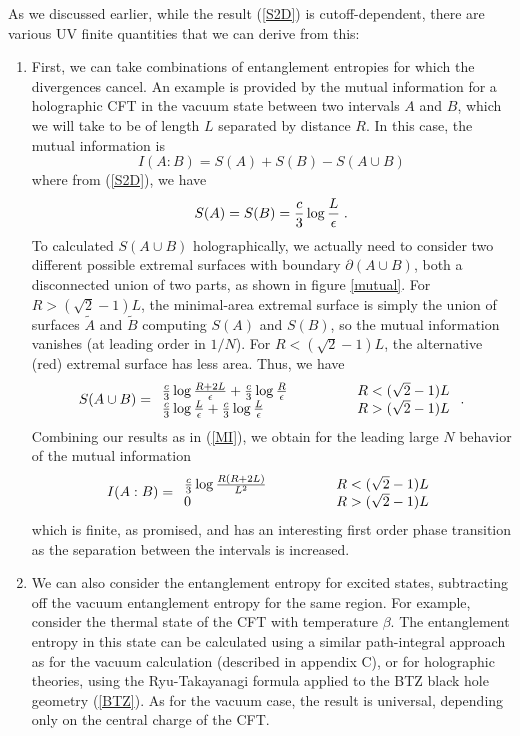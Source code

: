 \documentclass[12pt,epsf]{article}
\newcommand{\be}{\begin{equation}}
\newcommand{\ee}{\end{equation}}
\newcommand{\ba}{\begin{array}}
\newcommand{\ea}{\end{array}}
\begin{document}
As we discussed earlier, while the result (\ref{S2D}) is cutoff-dependent, there are various UV finite quantities that we can derive from this:

\begin{enumerate}
\item
First, we can take combinations of entanglement entropies for which the divergences cancel. An example is provided by the mutual information for a holographic CFT in the vacuum state between two intervals $A$ and $B$, which we will take to be of length $L$ separated by distance $R$. In this case, the mutual information is
\be
\label{MI}
I(A:B) = S(A) + S(B) - S(A \cup B)
\ee
where from (\ref{S2D}), we have
\be
S(A) = S(B) = {c \over 3} \log {L \over \epsilon} \; .
\ee
To calculated $S(A \cup B)$ holographically, we actually need to consider two different possible extremal surfaces with boundary $\partial (A \cup B)$, both a disconnected union of two parts, as shown in figure \ref{mutual}. For $R > (\sqrt{2} - 1)L$, the minimal-area extremal surface is simply the union of surfaces $\tilde{A}$ and $\tilde{B}$ computing $S(A)$ and $S(B)$, so the mutual information vanishes (at leading order in $1/N$). For $R < (\sqrt{2} - 1) L$, the alternative (red) extremal surface has less area. Thus, we have
\be
S(A \cup B) = \ba{ll} {c \over 3} \log {R + 2 L \over \epsilon} + {c \over 3}\log {R \over \epsilon} & \qquad \qquad  R < (\sqrt{2} - 1) L \cr
{c \over 3} \log {L \over \epsilon}  + {c \over 3} \log {L \over \epsilon} & \qquad \qquad R > (\sqrt{2} - 1) L \ea \; .
\ee
Combining our results as in (\ref{MI}), we obtain for the leading large $N$ behavior of the mutual information
\be
I(A:B) = \ba{ll} {c \over 3} \log {R(R + 2 L) \over L^2} & \qquad \qquad  R < (\sqrt{2} - 1) L \cr
0 & \qquad \qquad R > (\sqrt{2} - 1) L \ea
\ee
which is finite, as promised, and has an interesting first order phase transition as the separation between the intervals is increased.
\item
We can also consider the entanglement entropy for excited states, subtracting off the vacuum entanglement entropy for the same region. For example, consider the thermal state of the CFT with temperature $\beta$. The entanglement entropy in this state can be calculated \cite{Calabrese:2004eu} using a similar path-integral approach as for the vacuum calculation (described in appendix C), or for holographic theories, using the Ryu-Takayanagi formula applied to the BTZ black hole geometry (\ref{BTZ}). As for the vacuum case, the result is universal, depending only on the central charge of the CFT.


\end{enumerate}
\end{document}

